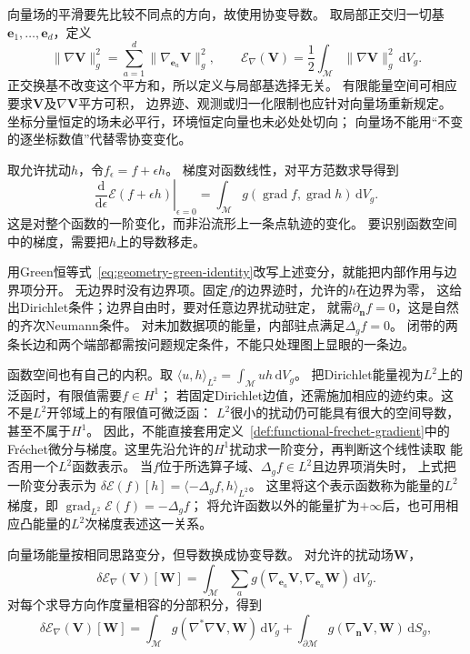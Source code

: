 向量场的平滑要先比较不同点的方向，故使用协变导数。
取局部正交归一切基$\bm e_1,\ldots,\bm e_d$，定义
\[
 \lVert\nabla\bm V\rVert_g^2
 =\sum_{a=1}^d\lVert\nabla_{\bm e_a}\bm V\rVert_g^2,\qquad
 \mathcal E_\nabla(\bm V)
 =\frac12\int_{\mathcal M}\lVert\nabla\bm V\rVert_g^2\,\mathrm dV_g.
\]
正交换基不改变这个平方和，所以定义与局部基选择无关。
有限能量空间可相应要求$\bm V$及$\nabla\bm V$平方可积，
边界迹、观测或归一化限制也应针对向量场重新规定。
坐标分量恒定的场未必平行，环境恒定向量也未必处处切向；
向量场不能用“不变的逐坐标数值”代替零协变变化。


取允许扰动$h$，令$f_\epsilon=f+\epsilon h$。
梯度对函数线性，对平方范数求导得到
\begin{equation}
 \left.\frac{\mathrm d}{\mathrm d\epsilon}
  \mathcal E(f+\epsilon h)\right|_{\epsilon=0}
 =\int_{\mathcal M}
    g(\operatorname{grad}f,\operatorname{grad}h)\,\mathrm dV_g.
 \label{eq:geometry-dirichlet-first-variation}
\end{equation}
这是对整个函数的一阶变化，而非沿流形上一条点轨迹的变化。
要识别函数空间中的梯度，需要把$h$上的导数移走。


用Green恒等式~\eqref{eq:geometry-green-identity}改写上述变分，就能把内部作用与边界项分开。
无边界时没有边界项。固定$f$的边界迹时，允许的$h$在边界为零，
这给出Dirichlet条件；边界自由时，要对任意边界扰动驻定，
就需$\partial_{\bm n}f=0$，这是自然的齐次Neumann条件。
对未加数据项的能量，内部驻点满足$\Delta_gf=0$。
闭带的两条长边和两个端部都需按问题规定条件，不能只处理图上显眼的一条边。

函数空间也有自己的内积。取
$\langle u,h\rangle_{L^2}=\int_{\mathcal M}uh\,\mathrm dV_g$。
把Dirichlet能量视为$L^2$上的泛函时，有限值需要$f\in H^1$；
若固定Dirichlet边值，还需施加相应的迹约束。这不是$L^2$开邻域上的有限值可微泛函：
$L^2$很小的扰动仍可能具有很大的空间导数，甚至不属于$H^1$。
因此，不能直接套用定义~\ref{def:functional-frechet-gradient}中的
Fréchet微分与梯度。这里先沿允许的$H^1$扰动求一阶变分，再判断这个线性读取
能否用一个$L^2$函数表示。
当$f$位于所选算子域、$\Delta_gf\in L^2$且边界项消失时，
上式把一阶变分表示为
$\delta\mathcal E(f)[h]=\langle-\Delta_gf,h\rangle_{L^2}$。
这里将这个表示函数称为能量的$L^2$梯度，即
$\operatorname{grad}_{L^2}\mathcal E(f)=-\Delta_gf$；
将允许函数以外的能量扩为$+\infty$后，也可用相应凸能量的$L^2$次梯度表述这一关系。


向量场能量按相同思路变分，但导数换成协变导数。
对允许的扰动场$\bm W$，
\[
 \delta\mathcal E_\nabla(\bm V)[\bm W]
 =\int_{\mathcal M}\sum_a
     g(\nabla_{\bm e_a}\bm V,\nabla_{\bm e_a}\bm W)\,\mathrm dV_g.
\]
对每个求导方向作度量相容的分部积分，得到
\begin{equation}
 \delta\mathcal E_\nabla(\bm V)[\bm W]
 =\int_{\mathcal M}g(\nabla^*\nabla\bm V,\bm W)\,\mathrm dV_g
  +\int_{\partial\mathcal M}g(\nabla_{\bm n}\bm V,\bm W)\,\mathrm dS_g,
 \label{eq:geometry-connection-laplacian-variation}
\end{equation}


